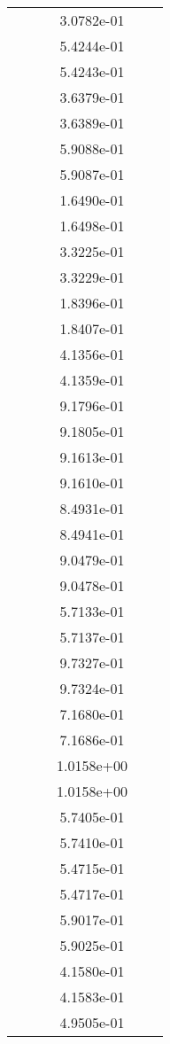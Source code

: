 \begin{xltabular}{\textwidth}{r|rS[table-format=1.3e+2]S[table-format=1.4e+2]S[table-format=1.4e+2]S[table-format=-1.5]}
&  &  & 3.0782e-01 & & \\
&  &  & 5.4244e-01 & & \\
&  &  & 5.4243e-01 & & \\
&  &  & 3.6379e-01 & & \\
&  &  & 3.6389e-01 & & \\
&  &  & 5.9088e-01 & & \\
&  &  & 5.9087e-01 & & \\
&  &  & 1.6490e-01 & & \\
&  &  & 1.6498e-01 & & \\
&  &  & 3.3225e-01 & & \\
&  &  & 3.3229e-01 & & \\
&  &  & 1.8396e-01 & & \\
&  &  & 1.8407e-01 & & \\
&  &  & 4.1356e-01 & & \\
&  &  & 4.1359e-01 & & \\
&  &  & 9.1796e-01 & & \\
&  &  & 9.1805e-01 & & \\
&  &  & 9.1613e-01 & & \\
&  &  & 9.1610e-01 & & \\
&  &  & 8.4931e-01 & & \\
&  &  & 8.4941e-01 & & \\
&  &  & 9.0479e-01 & & \\
&  &  & 9.0478e-01 & & \\
&  &  & 5.7133e-01 & & \\
&  &  & 5.7137e-01 & & \\
&  &  & 9.7327e-01 & & \\
&  &  & 9.7324e-01 & & \\
&  &  & 7.1680e-01 & & \\
&  &  & 7.1686e-01 & & \\
&  &  & 1.0158e+00 & & \\
&  &  & 1.0158e+00 & & \\
&  &  & 5.7405e-01 & & \\
&  &  & 5.7410e-01 & & \\
&  &  & 5.4715e-01 & & \\
&  &  & 5.4717e-01 & & \\
&  &  & 5.9017e-01 & & \\
&  &  & 5.9025e-01 & & \\
&  &  & 4.1580e-01 & & \\
&  &  & 4.1583e-01 & & \\
&  &  & 4.9505e-01 & & \\

\end{xltabular}
